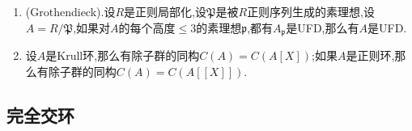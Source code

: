 \begin{enumerate}
\begin{proof}
    	如果可逆分式理想$I$满足$\mathrm{div}(I)=0$,那么对每个高度1素理想$\mathfrak{p}$有$v_{\mathfrak{p}}(x)=0$,于是特别的对每个$x\in I$和每个高度1素理想$\mathfrak{p}$都有$v_{\mathfrak{p}}(x)\ge0$,这说明$x\in A$,于是$I\subseteq A$.于是$A\subseteq I^{-1}$.同理从$\mathrm{div}(I^{-1})=0$得到$I^{-1}\subseteq A$,这就导致$I=A$.于是$I$同构于主分式理想,于是$\mathrm{div}$是单射.
    	
    	\qquad
    	
    	如果$A$是正则环,我们断言它的每个高度1素理想$\mathfrak{p}$都是可逆的,这就得到$\mathrm{div}$是满射.下面证明断言:按照$A$诺特有$\mathfrak{p}$是有限生成的,另外如果$\mathfrak{m}$是$A$的一个极大理想,如果$\mathfrak{p}\not\subseteq\mathfrak{m}$,那么$\mathfrak{p}A_{\mathfrak{m}}$是单位理想;如果$\mathfrak{p}\subseteq\mathfrak{m}$,按照$A_{\mathfrak{m}}$是UFD得到$\mathfrak{p}A_{\mathfrak{m}}$是主理想,于是无论如何有$\mathfrak{p}$是$A$的可逆分式理想.
    \end{proof}
    \item (Grothendieck).设$R$是正则局部化,设$\mathfrak{P}$是被$R$正则序列生成的素理想,设$A=R/\mathfrak{P}$,如果对$A$的每个高度$\le3$的素理想$\mathfrak{p}$,都有$A_{\mathfrak{p}}$是UFD,那么有$A$是UFD.
    \item 设$A$是Krull环,那么有除子群的同构$C(A)=C(A[X])$;如果$A$是正则环,那么有除子群的同构$C(A)=C(A[[X]])$.
\end{enumerate}
\newpage
\subsection{完全交环}


